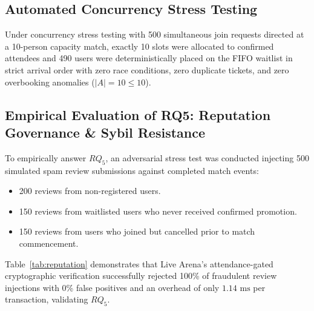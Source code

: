 \documentclass[conference]{IEEEtran}
\begin{document}
\subsection{Automated Concurrency Stress Testing}
Under concurrency stress testing with 500 simultaneous join requests directed at a 10-person capacity match, exactly 10 slots were allocated to confirmed attendees and 490 users were deterministically placed on the FIFO waitlist in strict arrival order with zero race conditions, zero duplicate tickets, and zero overbooking anomalies ($|A| = 10 \le 10$).

\subsection{Empirical Evaluation of RQ5: Reputation Governance \& Sybil Resistance}
To empirically answer $RQ_5$, an adversarial stress test was conducted injecting 500 simulated spam review submissions against completed match events:
\begin{itemize}
    \item 200 reviews from non-registered users.
    \item 150 reviews from waitlisted users who never received confirmed promotion.
    \item 150 reviews from users who joined but cancelled prior to match commencement.
\end{itemize}

\begin{table}[htbp]
\caption{Empirical Governance Evaluation Under Sybil Review Injection Attack ($N = 500$ Injected Attacks)}
\label{tab:reputation}
\centering
{}
\end{table}

Table~\ref{tab:reputation} demonstrates that Live Arena's attendance-gated cryptographic verification successfully rejected 100\% of fraudulent review injections with 0\% false positives and an overhead of only $1.14\text{ ms}$ per transaction, validating $RQ_5$.
\end{document}
